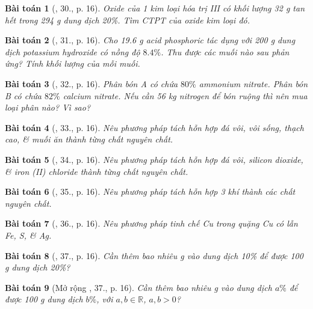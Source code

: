 \documentclass{article}
\newtheorem{baitoan}{Bài toán}
\begin{document}
\begin{baitoan}[\cite{An_400_BT_Hoa_Hoc_9}, 30., p. 16]
	Oxide của 1 kim loại hóa trị {\rm III} có khối lượng {\rm32 g} tan hết trong {\rm294 g} dung dịch {\rm{} 20\%}. Tìm {\rm CTPT} của oxide kim loại đó.
\end{baitoan}

\begin{baitoan}[\cite{An_400_BT_Hoa_Hoc_9}, 31., p. 16]
	Cho {\rm19.6 g} acid phosphoric tác dụng với {\rm200 g} dung dịch potassium hydroxide có nồng độ $8.4\%$. Thu được các muối nào sau phản ứng? Tính khối lượng của mỗi muối.
\end{baitoan}

\begin{baitoan}[\cite{An_400_BT_Hoa_Hoc_9}, 32., p. 16]
	Phân bón A có chứa $80\%$ ammonium nitrate. Phân bón B có chứa $82\%$ calcium nitrate. Nếu cần {\rm56 kg} nitrogen để bón ruộng thì nên mua loại phân nào? Vì sao?
\end{baitoan}

\begin{baitoan}[\cite{An_400_BT_Hoa_Hoc_9}, 33., p. 16]
	Nêu phương pháp tách hỗn hợp đá vôi, vôi sống, thạch cao, \& muối ăn thành từng chất nguyên chất.
\end{baitoan}

\begin{baitoan}[\cite{An_400_BT_Hoa_Hoc_9}, 34., p. 16]
	Nêu phương pháp tách hỗn hợp đá vôi, silicon dioxide, \& iron ({\rm II}) chloride thành từng chất nguyên chất.
\end{baitoan}

\begin{baitoan}[\cite{An_400_BT_Hoa_Hoc_9}, 35., p. 16]
	Nêu phương pháp tách hỗn hợp 3 khí {\rm{}} thành các chất nguyên chất.
\end{baitoan}

\begin{baitoan}[\cite{An_400_BT_Hoa_Hoc_9}, 36., p. 16]
	Nêu phương pháp tinh chế {\rm Cu} trong quặng {\rm Cu} có lẫn {\rm Fe, S}, \& {\rm Ag}.
\end{baitoan}

\begin{baitoan}[\cite{An_400_BT_Hoa_Hoc_9}, 37., p. 16]
	Cần thêm bao nhiêu {\rm g } vào dung dịch {\rm{} 10\%} để được {\rm100 g} dung dịch {\rm{} 20\%}?
\end{baitoan}

\begin{baitoan}[Mở rộng \cite{An_400_BT_Hoa_Hoc_9}, 37., p. 16]
	Cần thêm bao nhiêu {\rm g } vào dung dịch {\rm{} $a\%$} để được {\rm100 g} dung dịch {\rm{} $b\%$}, với $a,b\in\mathbb{R}$, $a,b > 0$?
\end{baitoan}
\end{document}
